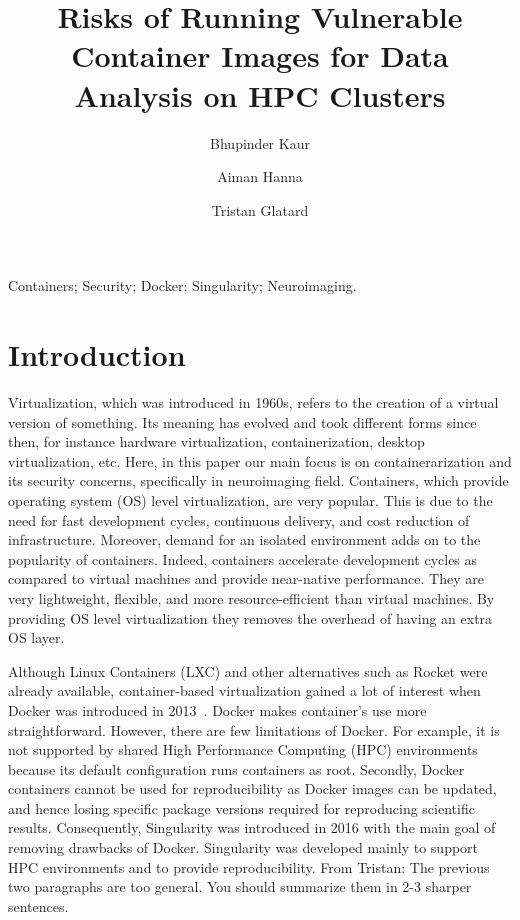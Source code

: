 \documentclass[a4paper,num-refs]{oup-contemporary}
\title{Risks of Running Vulnerable Container Images for Data Analysis on HPC
Clusters}
\newcommand{\TG}[1]{\color{blue}From Tristan: #1 \color{black}}
\begin{document}
\author[1]{Bhupinder Kaur}
\author[1]{Aiman Hanna}
\author[1]{Tristan Glatard}


\maketitle

\begin{keywords}
Containers; Security; Docker; Singularity; Neuroimaging.
\end{keywords}


\section{Introduction}

Virtualization, which was introduced in 1960s, refers to the creation of a virtual
version of something. Its meaning has evolved and took different forms since then, for
instance hardware virtualization, containerization, desktop virtualization, etc.
Here, in this paper our main focus is on containerarization and its security concerns,
specifically in neuroimaging field.
Containers, which provide operating system (OS) level virtualization, are very
popular. This is due to the need for fast development cycles, continuous delivery,
and cost reduction of infrastructure. Moreover, demand for an isolated
environment adds on to the popularity of containers. Indeed, containers accelerate
development cycles as compared to virtual machines and provide near-native performance.
They are very lightweight, flexible, and more resource-efficient than virtual
machines. By providing OS level virtualization they
removes the overhead of having an extra OS layer.

Although Linux Containers (LXC) and other alternatives such as Rocket were already
available, container-based virtualization gained a lot of interest when Docker was
introduced in 2013~\cite{gantikow2016providing}. Docker makes container's use more straightforward. However, there
are few limitations of Docker. For example, it is not supported by shared High Performance
Computing (HPC) environments because its default configuration runs containers
as root. Secondly, Docker containers cannot be used for reproducibility as Docker
images can be updated, and hence losing specific package versions required for
reproducing scientific results. Consequently, Singularity was introduced in 2016 with the main
goal of removing drawbacks of Docker. Singularity was developed mainly to
support HPC environments and to provide reproducibility. \TG{The previous two paragraphs are too general. You should
summarize them in 2-3 sharper sentences.}
\end{document}
